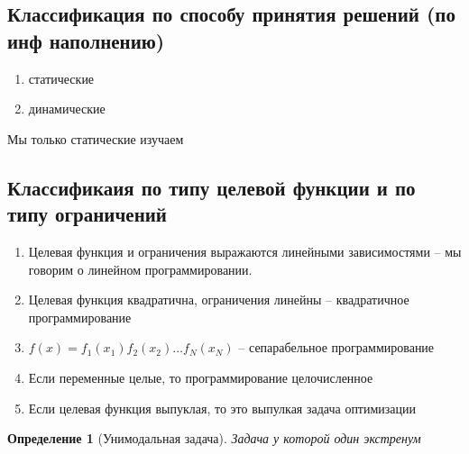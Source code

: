 \documentclass[14pt]{extarticle}
\newtheorem{definition}{Определение}
\begin{document}
	 \subsection{Классификация по способу принятия решений (по инф наполнению)}
	 \begin{enumerate}
	 	\item статические
		\item динамические
	 \end{enumerate}
	 Мы только статические изучаем
	 \subsection{Классификаия по типу целевой функции и по типу
	 ограничений}
	 \begin{enumerate}
	 	\item Целевая функция и ограничения выражаются 
			линейными зависимостями -- мы говорим о линейном программировании.
		\item Целевая функция квадратична, ограничения линейны -- квадратичное программирование
		\item $f(x) = f_1(x_1)f_2(x_2)\dots f_{N}(x_{N})$ -- сепарабельное программирование
		\item Если переменные целые, то программирование целочисленное
		\item Если целевая функция выпуклая, то это выпулкая задача оптимизации
	 \end{enumerate}
	 \begin{definition}[Унимодальная задача]
		 Задача у которой один экстренум
	 \end{definition}
\end{document}
